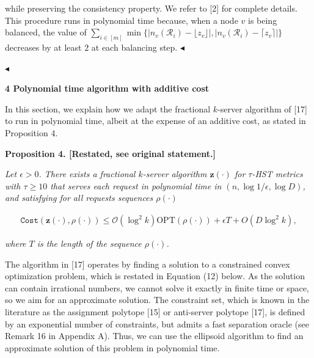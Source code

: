 while preserving the consistency property. We refer to [2] for complete details. This procedure runs in polynomial time because, when a node $v$ is being balanced, the value of $\sum_{i\in[m]}\min\{|n_{v}(\mathcal{R}_{i})-{\lfloor z_{v}\rfloor}|,|n_{v}(\mathcal{R}_{i})-{\lceil z_{v}\rceil}|\}$ decreases by at least $2$ at each balancing step.
$\blacktriangleleft$\par




$\blacktriangleleft$\par






\par\medskip\noindent\textbf{
4 Polynomial time algorithm with additive cost}\par




In this section, we explain how we adapt the fractional $k$-server algorithm of [17] to run in polynomial time, albeit at the expense of an additive cost, as stated in Proposition 4.\par






\par\medskip\noindent\textbf{
\textbf{Proposition 4}\textbf{.}
[Restated, see original statement.]}\par



\emph{Let $\epsilon>0$. There exists a
fractional $k$-server algorithm ${\mathbf{z}}(\cdot)$ for $\tau$-HST metrics with $\tau\geq 10$ that serves each request in polynomial time in $(n,\log 1/\epsilon,\log D)$, and satisfying for all requests sequences $\rho(\cdot)$}\par


\[\begin{gathered}
{\texttt{Cost}}({\mathbf{z}}(\cdot),\rho(\cdot))\leq\mathcal{O}(\log^{2}k){\text{OPT}}(\rho(\cdot))+\epsilon T+O(D\log^{2}k),
\end{gathered}\]


\emph{where $T$ is the length of the sequence $\rho(\cdot)$.}\par







The algorithm in [17] operates by finding a solution to a constrained convex optimization problem, which is restated in Equation (12) below. As the solution can contain irrational numbers, we cannot solve it exactly in finite time or space, so we aim for an approximate solution. The constraint set, which is known in the literature as the assignment polytope [15] or anti-server polytope [17], is defined by an exponential number of constraints, but admits a fast separation oracle (see Remark 16 in Appendix A). Thus, we can use the ellipsoid algorithm to find an approximate solution of this problem in polynomial time.\par




